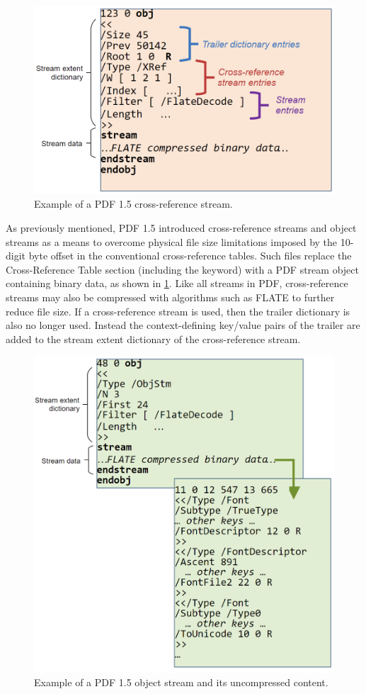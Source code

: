 \begin{figure}[t]
    \centering
    \includegraphics[width=0.65\linewidth]{figures/xrefstm.png}
    \caption{Example of a PDF 1.5 cross-reference stream.}
    \label{fig:XRefStm}
\end{figure}

As previously mentioned, PDF 1.5 introduced cross-reference streams and object streams as a means
to overcome physical file size limitations imposed by the 10-digit byte offset in the conventional
cross-reference tables.
Such files replace the Cross-Reference Table section (including the  keyword) 
with a PDF stream object containing binary data, as shown in \cref{fig:XRefStm}. 
Like all streams in PDF, cross-reference streams may also be compressed with algorithms such as FLATE 
to further reduce file size. If a cross-reference stream is used, then the trailer dictionary is also no
longer used. Instead the context-defining key/value pairs of the trailer are added to the stream 
extent dictionary of the cross-reference stream.

\begin{figure}[t]
    \centering
    \includegraphics[width=0.65\linewidth]{figures/ObjStm.png}
    \caption{Example of a PDF 1.5 object stream and its uncompressed content.}
    \label{fig:ObjStm}
\end{figure}

